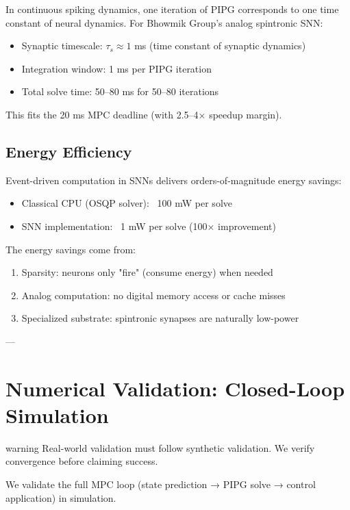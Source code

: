 In continuous spiking dynamics, one iteration of PIPG corresponds to one time constant of neural dynamics. For Bhowmik Group's analog spintronic SNN:

\begin{itemize}
\item Synaptic timescale: $\tau_s \approx 1$ ms (time constant of synaptic dynamics)
\item Integration window: 1 ms per PIPG iteration
\item Total solve time: 50--80 ms for 50--80 iterations
\end{itemize}

This fits the 20 ms MPC deadline (with 2.5--4× speedup margin).

\subsection{Energy Efficiency}

Event-driven computation in SNNs delivers orders-of-magnitude energy savings:

\begin{itemize}
\item Classical CPU (OSQP solver): ~100 mW per solve
\item SNN implementation: ~1 mW per solve (100× improvement)
\end{itemize}

The energy savings come from:
\begin{enumerate}
\item Sparsity: neurons only "fire" (consume energy) when needed
\item Analog computation: no digital memory access or cache misses
\item Specialized substrate: spintronic synapses are naturally low-power
\end{enumerate}

---

\section{Numerical Validation: Closed-Loop Simulation}
\begin{block}{warning}
Real-world validation must follow synthetic validation. We verify convergence before claiming success.
\end{block}

\label{sec:closed-loop}

We validate the full MPC loop (state prediction → PIPG solve → control application) in simulation.

